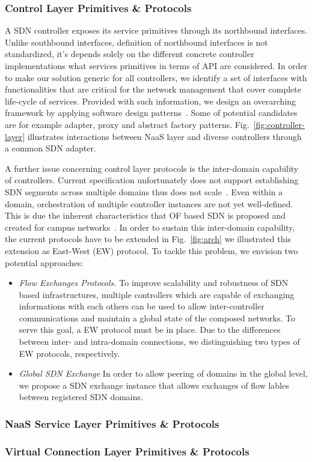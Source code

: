 \subsubsection{Control Layer Primitives \& Protocols} A SDN controller exposes
its service primitives through its northbound interfaces. Unlike southbound
interfaces, definition of northbound interfaces is not standardized, it's
depends solely on the different concrete controller implementations what
services primitives in terms of API are considered. In order to make our
solution generic for all controllers, we identify a set of interfaces with
functionalities that are critical for the network management that cover
complete life-cycle of services. Provided with such information, we design an
overarching framework by applying software design
patterns~\cite{gamma1994design}. Some of potential candidates are for example
adapter, proxy and abstract factory patterns. Fig.~\ref{fig:controller-layer} illustrates 
interactions between NaaS layer and diverse controllers through a common SDN adapter.

A further issue concerning control layer protocols is the inter-domain
capability of controllers. Current specification unfortunately does not support
establishing SDN segments across multiple domains thus does not
scale~\cite{scalability2013}. Even within a domain, orchestration of multiple
controller instances are not yet well-defined. This is due the inherent
characteristics that OF based SDN is proposed and created for campus
networks~\cite{openflow08}. In order to sustain this inter-domain capability,
the current protocols have to be extended in Fig.~\ref{fig:arch} we illustrated
this extension as East-West (EW) protocol. To tackle this problem, we envision
two potential approaches:

\begin{itemize}
	\item \textit{Flow Exchanges Protocols.} To improve scalability and
		robustness of SDN based infrastructures, multiple controllers which are
		capable of exchanging informations with each others can be used to
		allow inter-controller communications and maintain a global state of
		the composed networks. To serve this goal, a EW protocol must be in
		place. Due to the differences between inter- and intra-domain
		connections, we distinguishing two types of EW protocols, respectively.

	\item \textit{Global SDN Exchange} In order to allow peering of domains in
		the global level, we propose a SDN exchange instance that allows
		exchanges of flow lables between registered SDN domains.  

\end{itemize}

\subsubsection{NaaS Service Layer Primitives \& Protocols}


\subsubsection{Virtual Connection Layer Primitives \& Protocols}
